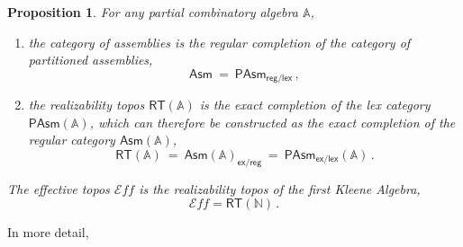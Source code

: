 \documentclass[12pt]{article}
\newcommand{\A}{\ensuremath{\mathbb{A}}}
\newcommand{\N}{\ensuremath{\mathbb{N}}}
\newcommand{\EE}{\ensuremath{\mathcal{E}}}
\newtheorem{proposition}[theorem]{Proposition}
\theoremstyle{remark}
\theoremstyle{definition}
\begin{document}
\begin{proposition} For any partial combinatory algebra $\A$,
\begin{enumerate}
\item
the category of assemblies is the regular completion of the category of partitioned assemblies,
\[
\mathsf{Asm} \ =\ \mathsf{PAsm}_{\mathsf{reg/lex}}\,,
\]
\item the \emph{realizability topos} $\mathsf{RT}(\A)$ is the exact completion of the lex category $\mathsf{PAsm}(\A)$, which can therefore be constructed as the exact completion of the regular category $\mathsf{Asm}(\A)$,
\[
\mathsf{RT(\A)}\ =\ \mathsf{Asm}(\A)_{\mathsf{ex/reg}} \ =\ \mathsf{PAsm}_{\mathsf{ex/lex}}(\A)\,.
\]
\end{enumerate}
The \emph{effective topos} ${\EE}{\!f\!f}$ is the realizability topos of the first Kleene Algebra, 
\[
{\EE}{\!f\!f} = \mathsf{RT(\N)}\,.
\]
\end{proposition}

In more detail, 




\end{document}
